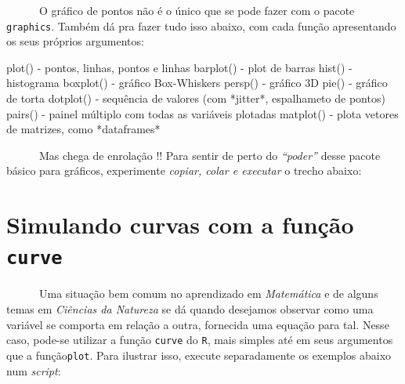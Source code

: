 \documentclass[
  letterpaper,
  DIV=11,
  numbers=noendperiod]{scrreprt}
\newenvironment{Shaded}{\begin{snugshade}}{\end{snugshade}}
\newcommand{\DecValTok}[1]{\textcolor[rgb]{0.68,0.00,0.00}{#1}}
\newcommand{\FunctionTok}[1]{\textcolor[rgb]{0.28,0.35,0.67}{#1}}
\newcommand{\NormalTok}[1]{\textcolor[rgb]{0.00,0.23,0.31}{#1}}
\newcommand{\SpecialCharTok}[1]{\textcolor[rgb]{0.37,0.37,0.37}{#1}}
\begin{document}
~~~~~~O gráfico de pontos não é o único que se pode fazer com o pacote
\texttt{graphics}. Também dá pra fazer tudo isso abaixo, com cada função
apresentando os seus próprios argumentos:

\begin{Shaded}
\begin{Highlighting}[]
\FunctionTok{plot}\NormalTok{() }\SpecialCharTok{{-}}\NormalTok{ pontos, linhas, pontos e linhas}
\FunctionTok{barplot}\NormalTok{() }\SpecialCharTok{{-}}\NormalTok{ plot de barras}
\FunctionTok{hist}\NormalTok{() }\SpecialCharTok{{-}}\NormalTok{ histograma}
\FunctionTok{boxplot}\NormalTok{() }\SpecialCharTok{{-}}\NormalTok{ gráfico Box}\SpecialCharTok{{-}}\NormalTok{Whiskers}
\FunctionTok{persp}\NormalTok{() }\SpecialCharTok{{-}}\NormalTok{ gráfico }\DecValTok{3}\NormalTok{D}
\FunctionTok{pie}\NormalTok{() }\SpecialCharTok{{-}}\NormalTok{ gráfico de torta}
\FunctionTok{dotplot}\NormalTok{() }\SpecialCharTok{{-}}\NormalTok{ sequência de }\FunctionTok{valores}\NormalTok{ (com }\SpecialCharTok{*}\NormalTok{jitter}\SpecialCharTok{*}\NormalTok{, espalhameto de pontos)}
\FunctionTok{pairs}\NormalTok{() }\SpecialCharTok{{-}}\NormalTok{ painel múltiplo com todas as variáveis plotadas}
\FunctionTok{matplot}\NormalTok{() }\SpecialCharTok{{-}}\NormalTok{ plota vetores de matrizes, como }\SpecialCharTok{*}\NormalTok{dataframes}\SpecialCharTok{*}
\end{Highlighting}
\end{Shaded}

~~~~~~Mas chega de enrolação !! Para sentir de perto do \emph{``poder''}
desse pacote básico para gráficos, experimente \emph{copiar, colar e
executar} o trecho abaixo:

\section{\texorpdfstring{Simulando curvas com a função
\texttt{curve}}{Simulando curvas com a função curve}}\label{simulando-curvas-com-a-funuxe7uxe3o-curve}

~~~~~~Uma situação bem comum no aprendizado em \emph{Matemática} e de
alguns temas em \emph{Ciências da Natureza} se dá quando desejamos
observar como uma variável se comporta em relação a outra, fornecida uma
equação para tal. Nesse caso, pode-se utilizar a função \texttt{curve}
do \texttt{R}, mais simples até em seus argumentos que a
função\texttt{plot}. Para ilustrar isso, execute separadamente os
exemplos abaixo num \emph{script}:
\end{document}
